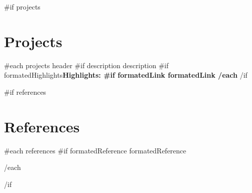 \documentclass[letterpaper]{article}
\begin{document}
\begin{paracol}{2}
\begin{rightcolumn}
  {{#if projects}}
  \section*{Projects} {
    {{#each projects}}
      {{ header }}
      {{#if description}}{{ description }}
      {{#if formatedHighlights}}\bfseries Highlights: 
      {{#if formatedLink}}{{ formatedLink }}
    {{/each}}
  }
  {{/if}}

  {{#if references}}
  \section*{References} {
    {{#each references}}
      {{#if formatedReference}}{{ formatedReference }}
      \par
    {{/each}}
  }
  {{/if}}

\end{rightcolumn}
\end{paracol}
\end{document}
